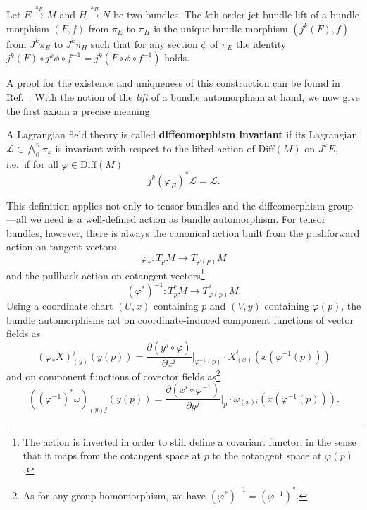 \begin{definition}
  Let $E \overset{\pi_E}{\longrightarrow} M$ and $H \overset{\pi_H}{\longrightarrow} N$ be two bundles. The $k$th-order jet bundle lift of a bundle morphism $(F,f)$ from $\pi_E$ to $\pi_H$ is the unique bundle morphism $(j^k(F),f)$ from $J^k\pi_E$ to $J^k\pi_H$ such that for any section $\phi$ of $\pi_E$ the identity $j^k(F) \circ j^k\phi\circ f^{-1} = j^k (F\circ\phi\circ f^{-1})$ holds.
\end{definition}
A proof for the existence and uniqueness of this construction can be found in Ref.\ \cite{Saunders_1989}. With the notion of the \emph{lift} of a bundle automorphism at hand, we now give the first axiom a precise meaning.
\begin{definition}
  A Lagrangian field theory is called \textbf{diffeomorphism invariant} if its Lagrangian $\mathscr L\in\textstyle\bigwedge_0^n\pi_k$ is invariant with respect to the lifted action of $\mathrm{Diff}(M)$ on $J^kE$, i.e.\ if for all $\varphi\in\mathrm{Diff}(M)$
  \begin{equation}\label{lagrangian_diffeo_invariance}
    j^k(\varphi_E)^\ast \mathscr L = \mathscr L.
  \end{equation}
\end{definition}
This definition applies not only to tensor bundles and the diffeomorphism group---all we need is a well-defined action as bundle automorphism. For tensor bundles, however, there is always the canonical action built from the pushforward action on tangent vectors
\begin{equation}
  \varphi_\ast\colon T_pM\rightarrow T_{\varphi(p)}M
\end{equation}
and the pullback action on cotangent vectors\footnote{The action is inverted in order to still define a covariant functor, in the sense that it maps from the cotangent space at $p$ to the cotangent space at $\varphi(p)$.}
\begin{equation}
   (\varphi^\ast)^{-1}\colon T^\ast_pM\rightarrow T^\ast_{\varphi(p)}M.
\end{equation}
Using a coordinate chart $(U,x)$ containing $p$ and $(V,y)$ containing $\varphi(p)$, the bundle automorphisms act on coordinate-induced component functions of vector fields as
\begin{equation}\label{diffeo_vector_coordinates}
(\varphi_\ast X)_{(y)}^j(y(p)) = \frac{\partial (y^j\circ \varphi)}{\partial x^i} \Bigg\rvert_{\varphi^{-1}(p)} \cdot X_{(x)}^i(x(\varphi^{-1}(p)))
\end{equation}
and on component functions of covector fields as\footnote{As for any group homomorphism, we have $(\varphi^\ast)^{-1}=(\varphi^{-1})^\ast$.}
\begin{equation}\label{diffeo_covector_coordinates}
((\varphi^{-1})^\ast\omega)_{(y)j}(y(p)) = \frac{\partial (x^i\circ \varphi^{-1})}{\partial y^j}\Bigg\rvert_p \cdot \omega_{(x)i}(x(\varphi^{-1}(p))).
\end{equation}

